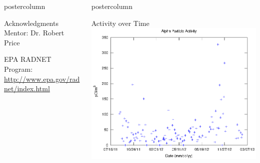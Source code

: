 \documentclass[final,11pt]{beamer}
\newlength{\columnheight}
\begin{document}
\begin{frame}
\begin{columns}
\begin{column}{.39\textwidth}
\begin{beamercolorbox}[center,wd=\textwidth]{postercolumn}
\begin{minipage}[T]{.95\textwidth}
{						\begin{block}{Acknowledgments}
						\footnotesize Mentor: Dr. Robert Price 

						 EPA RADNET Program: \url{http://www.epa.gov/radnet/index.html}
						\end{block}
					}
				\end{minipage}
			\end{beamercolorbox}
		\end{column}

		\begin{column}{.30\textwidth}
			\begin{beamercolorbox}[center,wd=\textwidth]{postercolumn}
				\begin{minipage}[T]{.95\textwidth}
					\parbox[t][\columnheight]{\textwidth}{
						\begin{block}{Activity over Time}
						\includegraphics[width=.85\linewidth]{alphaTime}


\end{block}}
\end{minipage}
\end{beamercolorbox}
\end{column}
\end{columns}
\end{frame}
\end{document}
